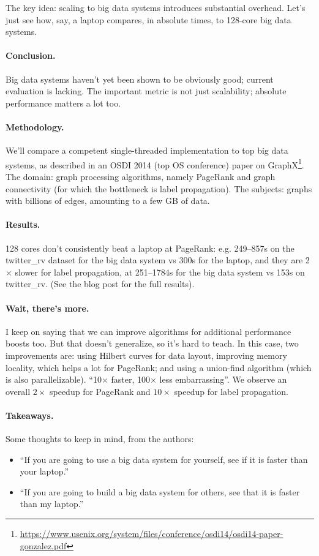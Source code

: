 \documentclass[11pt]{article}
\newenvironment{itemizep}{
 \begin{itemize}
  \setlength{\itemsep}{0pt}
  \setlength{\parsep}{3pt}
  \setlength{\topsep}{3pt}
  \setlength{\partopsep}{0pt}
  \setlength{\leftmargin}{1.5em}
  \setlength{\labelwidth}{1em}
  \setlength{\labelsep}{0.5em} }
 {\end{itemize}}
\begin{document}
The key idea: scaling to big data systems introduces substantial overhead. Let's just see how, say, a
laptop compares, in absolute times, to 128-core big data systems.

\paragraph{Conclusion.} Big data systems haven't yet been shown to be obviously good; current evaluation is lacking.
The important metric is not just scalability; absolute
performance matters a lot too.

\paragraph{Methodology.} We'll compare a competent single-threaded implementation to top
big data systems, as described in an OSDI 2014 (top OS conference) paper on GraphX\footnote{\url{https://www.usenix.org/system/files/conference/osdi14/osdi14-paper-gonzalez.pdf}}. The domain: graph processing
algorithms, namely PageRank and graph connectivity (for which the bottleneck is label propagation). The subjects: graphs with billions of edges, amounting to a few
GB of data.

\paragraph{Results.} 128 cores don't consistently beat a laptop at PageRank: e.g. 249--857s on the twitter\_rv dataset for the big data system vs 300s for the laptop, and they are 2$\times$ slower for label
propagation, at 251--1784s for the big data system vs 153s on
twitter\_rv. (See the blog post for the full results).

\paragraph{Wait, there's more.} I keep on saying that we can improve algorithms for additional performance boosts too.
But that doesn't generalize, so it's hard to teach. In this case, two improvements are: using Hilbert curves
for data layout, improving memory locality, which helps a lot for PageRank; and using a union-find algorithm 
(which is also parallelizable). ``10$\times$ faster, 100$\times$ less embarrassing''.  We observe an overall
$2\times$ speedup for PageRank and $10\times$ speedup for label propagation.

\paragraph{Takeaways.} Some thoughts to keep in mind, from the authors:
\begin{itemizep}
\item    ``If you are going to use a big data system for yourself, see if it is faster than your laptop.''
\item    ``If you are going to build a big data system for others, see that it is faster than my laptop.''
\end{itemizep}
\end{document}
